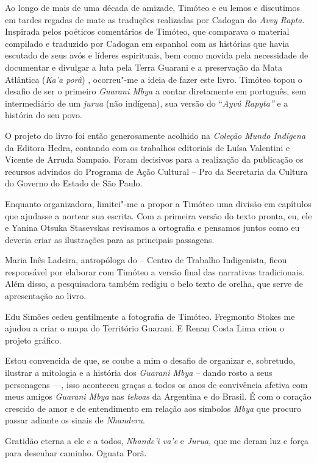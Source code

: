 Ao longo de mais de uma década de amizade, Timóteo e eu lemos e
discutimos em tardes regadas de mate as traduções realizadas por Cadogan
do \emph{Avvy Rapta}. Inspirada pelos poéticos comentários de Timóteo,
que comparava o material compilado e traduzido por Cadogan em espanhol
com as histórias que havia escutado de seus avós e líderes espirituais,
bem como movida pela necessidade de documentar e divulgar a luta pela
Terra Guarani e a preservação da Mata Atlântica (\emph{Ka'a porã}) ,
ocorreu"-me a ideia de fazer este livro. Timóteo topou o desafio de ser o
primeiro \emph{Guarani Mbya} a contar diretamente em português, sem
intermediário de um \emph{jurua} (não indígena), sua versão do
``\emph{Ayvú Rapyta''} e a história do seu povo.

O projeto do livro foi então generosamente acolhido na \emph{Coleção
Mundo Indígena} da Editora Hedra, contando com os trabalhos editoriais
de Luísa Valentini e Vicente de Arruda Sampaio. Foram decisivos para a
realização da publicação os recursos advindos do Programa de Ação
Cultural -- Pro da Secretaria da Cultura do Governo do Estado de São
Paulo.

Enquanto organizadora, limitei"-me a propor a Timóteo uma divisão em
capítulos que ajudasse a nortear sua escrita. Com a primeira versão do
texto pronta, eu, ele e Yanina Otsuka Stasevskas revisamos a ortografia
e pensamos juntos como eu deveria criar as ilustrações para as
principais passagens.

Maria Inês Ladeira, antropóloga do  -- Centro de Trabalho
Indigenista, ficou responsável por elaborar com Timóteo a versão final
das narrativas tradicionais. Além disso, a pesquisadora também redigiu o
belo texto de orelha, que serve de apresentação ao livro.

Edu Simões cedeu gentilmente a fotografia de Timóteo. Fregmonto Stokes
me ajudou a criar o mapa do Território Guarani. E Renan Costa Lima criou
o projeto gráfico.

Estou convencida de que, se coube a mim o desafio de organizar e,
sobretudo, ilustrar a mitologia e a história dos \emph{Guarani Mbya} --
dando rosto a seus personagens \mbox{---,} isso aconteceu graças a todos os anos
de convivência afetiva com meus amigos \emph{Guarani Mbya} nas
\emph{tekoas} da Argentina e do Brasil. É com o coração crescido de amor
e de entendimento em relação aos símbolos \emph{Mbya} que procuro passar
adiante os sinais de \emph{Nhanderu}.

Gratidão eterna a ele e a todos, \emph{Nhande'i
va'e} e \emph{Jurua,} que me deram luz e força para desenhar caminho.
Oguata Porã.

